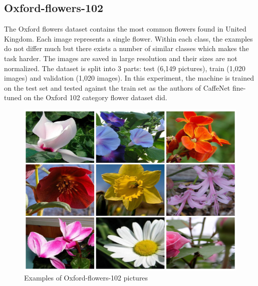 \documentclass[licencjacka]{pracamgr}
\begin{document}
 		\subsection{Oxford-flowers-102}
 		The Oxford flowers dataset contains the most common flowers found in United Kingdom. Each image represents a single flower. Within each class, the examples do not differ much but there exists a number of similar classes which makes the task harder. The images are saved in large resolution and their sizes are not normalized. The dataset is split into 3 parts: test (6,149 pictures), train (1,020 images) and validation (1,020 images). In this experiment, the machine is trained on the test set and tested against the train set as the authors of CaffeNet fine-tuned on the Oxford 102 category flower dataset did.
 			\begin{figure}[h]
				\caption{Examples of Oxford-flowers-102 pictures}
				\centering
				\includegraphics[width=\textwidth]{images/flowers}
			\end{figure}
\end{document}
